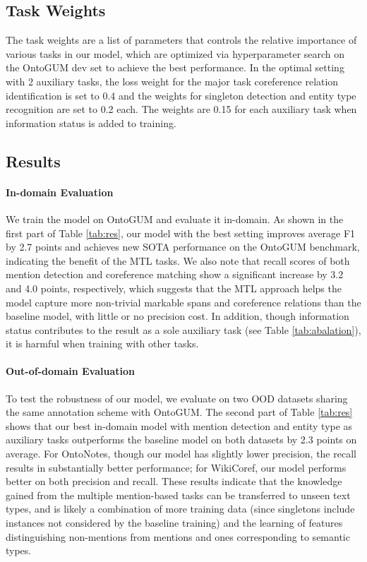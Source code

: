 \documentclass[11pt]{article}
\begin{document}
\subsection{Task Weights}
The task weights are a list of parameters that controls the relative importance of various tasks in our model, which are optimized via hyperparameter search on the OntoGUM dev set to achieve the best performance. In the optimal setting with 2 auxiliary tasks, the loss weight for the major task coreference relation identification is set to 0.4 and the weights for singleton detection and entity type recognition 
are set to 0.2 each. The weights are 0.15 for each auxiliary task when information status is added to training.

\subsection{Results}
\paragraph{In-domain Evaluation}
We train the model on OntoGUM and evaluate it in-domain.
As shown in the first part of Table \ref{tab:res}, our model with the best setting improves average F1 by 2.7 points and achieves new SOTA performance on the OntoGUM benchmark, indicating the benefit of the MTL tasks. We also note that recall scores of both mention detection and coreference matching show a significant increase by 3.2 and 4.0 points, respectively,
which suggests that the MTL approach helps the model capture more non-trivial markable spans and coreference relations than the baseline model, with little or no precision cost. In addition, though information status contributes to the result as a sole auxiliary task (see Table \ref{tab:abalation}), it is harmful when training with other tasks.

\paragraph{Out-of-domain Evaluation}
To test the robustness of our model, we evaluate on two OOD datasets sharing the same annotation scheme with OntoGUM. The second part of Table \ref{tab:res} shows that our best in-domain model with mention detection and entity type as auxiliary tasks outperforms the baseline model on both datasets by 2.3 points on average. For OntoNotes, though our model has slightly lower precision, the recall results in substantially better performance; for WikiCoref, our model performs better on both precision and recall. These results indicate that the knowledge gained from the multiple mention-based tasks can be transferred to unseen text types, 
and is likely a combination of more training data (since singletons include instances not considered by the baseline training) and the learning of features distinguishing non-mentions from mentions and ones corresponding to semantic types.
\end{document}
